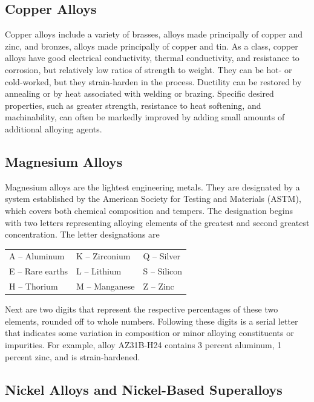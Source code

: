 \documentclass[
10pt,
a4paper,
openany,
svgnames,
]{book}
\begin{document}
\subsection{Copper Alloys}

Copper alloys include a variety of brasses, alloys made principally of copper and zinc, and bronzes, alloys made principally of copper and tin. As a class, copper alloys have good electrical conductivity, thermal conductivity, and resistance to corrosion, but relatively low ratios of strength to weight. They can be hot- or cold-worked, but they strain-harden in the process. Ductility can be restored by annealing or by heat associated with welding or brazing. Specific desired properties, such as greater strength, resistance to heat softening, and machinability, can often be markedly improved by adding small amounts of additional alloying agents.

\subsection{Magnesium Alloys}

Magnesium alloys are the lightest engineering metals. They are designated by a system established by the American Society for Testing and Materials (ASTM), which covers both chemical composition and tempers. The designation begins with two letters representing alloying elements of the greatest and second greatest concentration. The letter designations are

\begin{table}[h]
  \centering
  \begin{tabular}{ C{3cm} C{3cm} C{3cm} }
    \hline
    A – Aluminum & K – Zirconium & Q – Silver \\
    E – Rare earths & L – Lithium & S – Silicon \\
    H – Thorium & M – Manganese & Z – Zinc \\
    \hline
  \end{tabular}
\end{table}

Next are two digits that represent the respective percentages of these two elements, rounded off to whole numbers. Following these digits is a serial letter that indicates some variation in composition or minor alloying constituents or impurities. For example, alloy AZ31B-H24 contains 3 percent aluminum, 1 percent zinc, and is strain-hardened.

\subsection{Nickel Alloys and Nickel-Based Superalloys}
\end{document}
